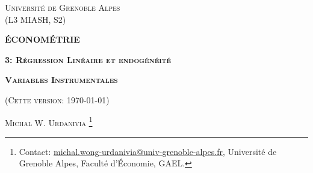 \documentclass[10pt, reqno]{amsart}
\begin{document}
 
\usetikzlibrary{positioning}
\usetikzlibrary{snakes}
\usetikzlibrary{calc}
\usetikzlibrary{arrows}
\usetikzlibrary{decorations.markings}
\usetikzlibrary{shapes.misc}
\usetikzlibrary{shapes}

%

\begin{titlepage}
\centering
	{\scshape\Large \textsc{Université de Grenoble Alpes\\(L3 MIASH, S2)}\par}
	\vspace{0.5cm}
	{\Large\bfseries \scshape\Large \textsc{ÉCONOMÉTRIE}\par}
	\vspace{0.5cm}
	{\Large\bfseries \textsc{3: Régression Linéaire et endogénéité} \par}
    \vspace{1cm}   
    {\Large\bfseries \textsc{Variables Instrumentales} \par}
	\vspace{1cm}
	{(\textsc{Cette version: \today})\par}
	\vspace{1cm}
	{\large \textsc{Michal W. Urdanivia}
	\footnote{Contact:  
	\href{mailto:michal.wong-urdanivia@univ-grenoble-alpes.fr}{michal.wong-urdanivia@univ-grenoble-alpes.fr}, 
	 Université de Grenoble Alpes,  Faculté d'\'Economie, GAEL.}\par}
	
\end{titlepage}


\newpage

\tableofcontents

\newpage
\end{document}
